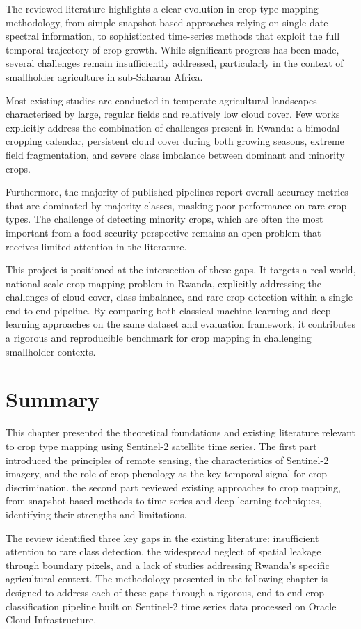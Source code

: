   The reviewed literature highlights a clear evolution in crop 
  type mapping methodology, from simple snapshot-based 
  approaches relying on single-date spectral information, 
  to sophisticated time-series methods that exploit the 
  full temporal trajectory of crop growth. While significant 
  progress has been made, several challenges remain 
  insufficiently addressed, particularly in the context 
  of smallholder agriculture in sub-Saharan Africa.

  Most existing studies are conducted in temperate agricultural 
  landscapes characterised by large, regular fields and 
  relatively low cloud cover. Few works explicitly address 
  the combination of challenges present in Rwanda: a bimodal 
  cropping calendar, persistent cloud cover during both 
  growing seasons, extreme field fragmentation, and severe 
  class imbalance between dominant and minority crops.

  Furthermore, the majority of published pipelines report 
  overall accuracy metrics that are dominated by majority 
  classes, masking poor performance on rare crop types. 
  The challenge of detecting minority crops, which are 
  often the most important from a food security perspective 
  remains an open problem that receives limited 
  attention in the literature.

  This project is positioned at the intersection of these 
  gaps. It targets a real-world, national-scale crop 
  mapping problem in Rwanda, explicitly addressing the 
  challenges of cloud cover, class imbalance, and rare 
  crop detection within a single end-to-end pipeline. 
  By comparing both classical machine learning and deep 
  learning approaches on the same dataset and evaluation 
  framework, it contributes a rigorous and reproducible 
  benchmark for crop mapping in challenging smallholder 
  contexts.




\section{Summary}

This chapter presented the theoretical foundations and 
existing literature relevant to crop type mapping using 
Sentinel-2 satellite time series. The first part introduced 
the principles of remote sensing, the characteristics 
of Sentinel-2 imagery, and the role of crop phenology 
as the key temporal signal for crop discrimination. 
the second part reviewed existing approaches to crop mapping, 
from snapshot-based methods to time-series and deep 
learning techniques, identifying their strengths and 
limitations.

The review identified three key gaps in the existing 
literature: insufficient attention to rare class 
detection, the widespread neglect of spatial leakage 
through boundary pixels, and a lack of studies 
addressing Rwanda's specific agricultural context. 
The methodology presented in the following chapter 
is designed to address each of these gaps through 
a rigorous, end-to-end crop classification pipeline 
built on Sentinel-2 time series data processed on 
Oracle Cloud Infrastructure.
